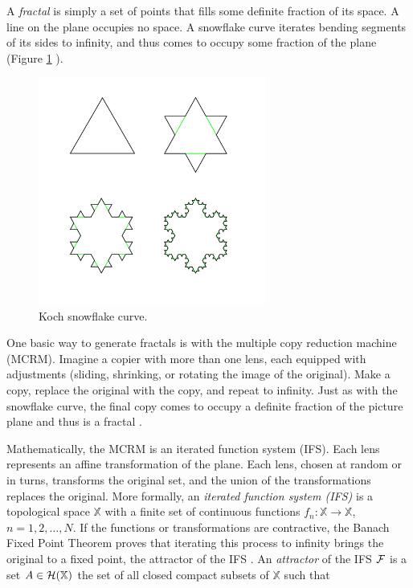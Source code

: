 \documentclass[english,11pt,letterpaper,onecolumn]{scrartcl}
\numberwithin{equation}{section}
\newcommand{\X}{\mathbb{X}}
\begin{document}
A \textit{fractal} is simply a set of points that fills some definite fraction 
of its space. A line on the plane occupies no space. A snowflake curve 
iterates bending segments of its sides to infinity, and thus comes to occupy 
some fraction of the plane (Figure \ref{fig:kochflake} 
\cite{Mandelbrot:1982:FGN}).

    \begin{figure}
        \centerline{\includegraphics[width = 0.6667\textwidth]{KochFlake}}
        \caption{\label{fig:kochflake} Koch snowflake 
curve.\protect\footnotemark}
    \end{figure}


One basic way to generate fractals is with the multiple copy reduction 
machine (MCRM). Imagine a copier with more than one lens, each equipped with 
adjustments (sliding, shrinking, or rotating the image of the original). Make 
a copy, replace the original with the copy, and repeat to infinity. Just as 
with the snowflake curve, the final copy comes to occupy a definite fraction 
of the picture plane and thus is a fractal \cite{chaosandfractals}. 

Mathematically, the MCRM is an iterated function system (IFS). Each lens 
represents an affine transformation of the plane. Each lens, chosen at random 
or in turns, transforms the original set, and the union of the transformations 
replaces the original. More formally, an \emph{iterated function system (IFS)}
is a topological space $\mathbb{X}$ with a finite set of continuous functions 
$f_{n}:\X\rightarrow \X$, 
$n=1,2,\dots,N$. If the functions or transformations are contractive, the 
Banach Fixed Point Theorem proves that iterating this process to infinity 
brings the original to a fixed point, the attractor of the IFS 
\cite{chaosandfractals, barnsley1985iterated, 10.2307/24893080, 
fractalseverywhere}. An \emph{attractor} of the IFS $\cal{F}$ is a set
$A\in \cal{H}(\X)$ the set of all closed compact subsets of $\X$ such that
\end{document}
